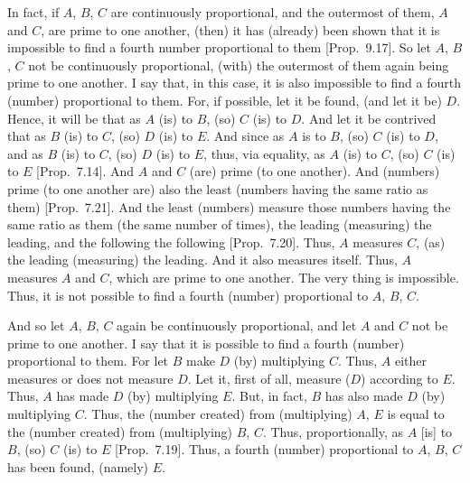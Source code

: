 \begin{Parallel}{}{}
{In fact, if $A$, $B$, $C$ are continuously proportional, and the outermost
of them, $A$ and $C$, are prime to one another, (then) it has (already) been shown that it is impossible to find a fourth number proportional to them
[Prop.~9.17]. So let $A$, $B$, $C$
not be continuously proportional, (with) the outermost of them again being
prime to one another. I say that, in this case, it is also impossible to find a fourth (number)
proportional to them. For, if possible, let it be found,
(and let it be) $D$. Hence, it will be that as $A$ (is) to $B$, (so)
$C$ (is) to $D$. And let it be contrived that as $B$ (is) to $C$, (so) $D$ (is) to $E$. And since as $A$ is to $B$, (so) $C$ (is) to $D$, and as $B$ (is) to $C$, (so)
$D$ (is) to $E$, thus, via equality, as $A$ (is) to $C$, (so) $C$ (is) to $E$
[Prop.~7.14]. And $A$ and $C$ (are) prime (to one another). And (numbers) prime (to one another are) also the least (numbers
having the same ratio as them) [Prop.~7.21]. 
And the least (numbers) measure those numbers having the same ratio
as them (the same number of times), the leading (measuring) the leading,
and the following the following [Prop.~7.20]. 
Thus, $A$ measures $C$, (as) the leading (measuring) the leading.
And it also measures itself. Thus, $A$ measures $A$ and $C$, which are
prime to one another. The very thing is impossible. Thus, it is not possible to find a fourth (number) proportional to $A$, $B$, $C$.

And so let $A$, $B$, $C$  again be continuously proportional, and let $A$ and $C$ not be prime to one another. I say that it is possible to find
a fourth (number) proportional to them. For let $B$ make $D$ (by) multiplying $C$. Thus, $A$ either measures or does not measure $D$. 
Let it, first of all, measure ($D$) according to $E$. Thus, $A$ has made $D$ (by) multiplying $E$. But, in fact, $B$ has also made $D$ (by) multiplying $C$. Thus, the (number created) from (multiplying) $A$, $E$
is equal to the (number created) from (multiplying) $B$, $C$. Thus, 
proportionally, as $A$ [is] to $B$, (so) $C$ (is) to $E$ [Prop.~7.19]. Thus, a fourth (number) proportional
to $A$, $B$, $C$ has been found, (namely) $E$.

}
\end{Parallel}
